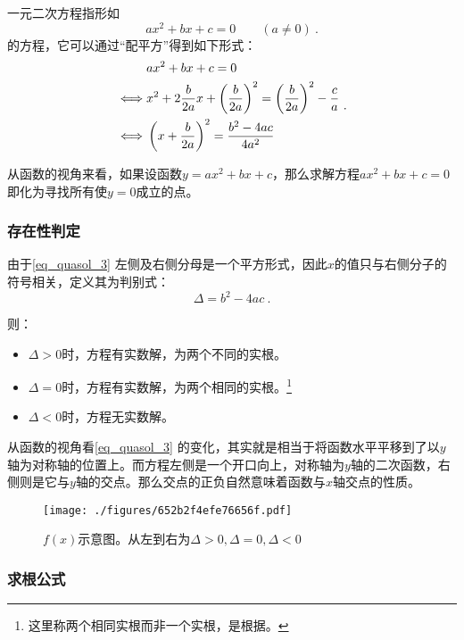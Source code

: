 一元二次方程指形如
\begin{equation}
ax^2+bx+c=0 \qquad (a\neq 0)~.
\end{equation}
的方程，它可以通过“配平方”得到如下形式：
\begin{equation}\label{eq_quasol_3}
\begin{split}
 & ax^2+bx+c = 0 \\ 
\iff&x^2+2{b\over 2a} x+\left({b\over 2a}\right)^2 = \left({b\over 2a}\right)^2-{c\over a} \\ 
\iff&\left(x+{b\over 2a}\right)^2 = {b^2-4ac\over 4a^2} \\ 
\end{split}~.
\end{equation}

从函数的视角来看，如果设函数$y=ax^2+bx+c$，那么求解方程$ax^2+bx+c=0$即化为寻找所有使$y=0$成立的点。

\subsubsection{存在性判定}

由于\autoref{eq_quasol_3} 左侧及右侧分母是一个平方形式，因此$x$的值只与右侧分子的符号相关，定义其为判别式：
\begin{equation}\label{eq_quasol_4}
\Delta = b^2-4ac~.
\end{equation}

则：
\begin{itemize}
\item $\Delta > 0$时，方程有实数解，为两个不同的实根。
\item $\Delta = 0$时，方程有实数解，为两个相同的实根。\footnote{这里称两个相同实根而非一个实根，是根据。}
\item $\Delta < 0$时，方程无实数解。
\end{itemize}

从函数的视角看\autoref{eq_quasol_3} 的变化，其实就是相当于将函数水平平移到了以$y$轴为对称轴的位置上。而方程左侧是一个开口向上，对称轴为$y$轴的二次函数，右侧则是它与$y$轴的交点。那么交点的正负自然意味着函数与$x$轴交点的性质。

\begin{figure}[ht]
\centering
\texttt{[image: ./figures/652b2f4efe76656f.pdf]}
\caption{$f(x)$示意图。从左到右为$\Delta > 0, \Delta = 0, \Delta < 0$} \label{fig_quasol_1}
\end{figure}

\subsubsection{求根公式}

